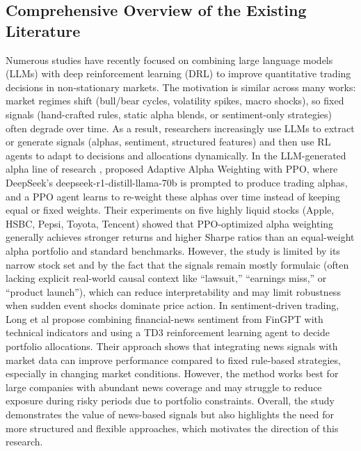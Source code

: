 \documentclass[a4paper,fleqn]{cas-sc}
\begin{document}
\subsection{Comprehensive Overview of the Existing Literature }\label{sec:Research}
Numerous studies have recently focused on combining large language models (LLMs) with deep reinforcement learning (DRL) to improve quantitative trading decisions in non-stationary markets. The motivation is similar across many works: market regimes shift (bull/bear cycles, volatility spikes, macro shocks), so fixed signals (hand-crafted rules, static alpha blends, or sentiment-only strategies) often degrade over time. As a result, researchers increasingly use LLMs to extract or generate signals (alphas, sentiment, structured features) and then use RL agents to adapt to decisions and allocations dynamically. 
In the LLM-generated alpha line of research \cite{kawashima2025risk}, proposed Adaptive Alpha Weighting with PPO, where DeepSeek’s deepseek-r1-distill-llama-70b is prompted to produce trading alphas, and a PPO agent learns to re-weight these alphas over time instead of keeping equal or fixed weights. Their experiments on five highly liquid stocks (Apple, HSBC, Pepsi, Toyota, Tencent) showed that PPO-optimized alpha weighting generally achieves stronger returns and higher Sharpe ratios than an equal-weight alpha portfolio and standard benchmarks. However, the study is limited by its narrow stock set and by the fact that the signals remain mostly formulaic (often lacking explicit real-world causal context like “lawsuit,” “earnings miss,” or “product launch”), which can reduce interpretability and may limit robustness when sudden event shocks dominate price action. 
In sentiment-driven trading,
 Long et al \cite{long} propose combining financial-news sentiment from FinGPT with technical indicators and using a TD3 reinforcement learning agent to decide portfolio allocations. Their approach shows that integrating news signals with market data can improve performance compared to fixed rule-based strategies, especially in changing market conditions. However, the method works best for large companies with abundant news coverage and may struggle to reduce exposure during risky periods due to portfolio constraints. Overall, the study demonstrates the value of news-based signals but also highlights the need for more structured and flexible approaches, which motivates the direction of this research. 
\end{document}
